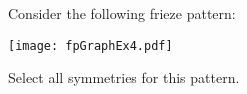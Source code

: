 \documentclass{ximera}
\author{Bart Snapp}
\begin{document}
\begin{exercise}
  Consider the following frieze pattern:
  \begin{image}
  \texttt{[image: fpGraphEx4.pdf]}
  \end{image}
  Select all symmetries for this pattern.
  \begin{selectAll}
  \end{selectAll}
\end{exercise}
\end{document}
